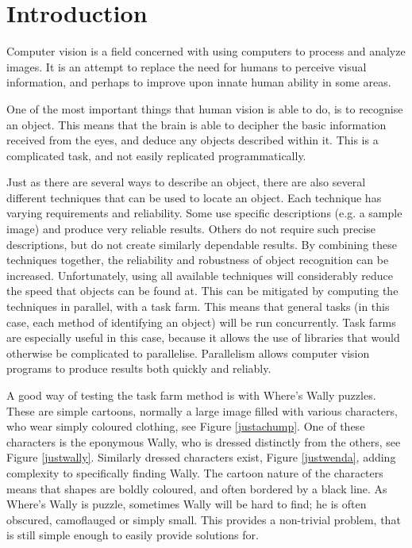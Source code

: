\documentclass[../main.tex]{subfiles}
\begin{document}
  \section{Introduction}
    Computer vision is a field concerned with using computers to process and analyze images. 
    It is an attempt to replace the need for humans to perceive visual information, and perhaps to improve upon innate human ability in some areas.

    One of the most important things that human vision is able to do, is to recognise an object. 
    This means that the brain is able to decipher the basic information received from the eyes, and deduce any objects described within it.
    This is a complicated task, and not easily replicated programmatically.

    Just as there are several ways to describe an object, there are also several different techniques that can be used to locate an object.
    Each technique has varying requirements and reliability.
    Some use specific descriptions (e.g. a sample image) and produce very reliable results.
    Others do not require such precise descriptions, but do not create similarly dependable results.
    By combining these techniques together, the reliability and robustness of object recognition can be increased.
    Unfortunately, using all available techniques will considerably reduce the speed that objects can be found at.
    This can be mitigated by computing the techniques in parallel, with a task farm.
    This means that general tasks (in this case, each method of identifying an object) will be run concurrently.
    Task farms are especially useful in this case, because it allows the use of libraries that would otherwise be complicated to parallelise.
    Parallelism allows computer vision programs to produce results both quickly and reliably.

    A good way of testing the task farm method is with Where's Wally puzzles.
    These are simple cartoons, normally a large image filled with various characters, who wear simply coloured clothing, see Figure \ref{justachump}.
    One of these characters is the eponymous Wally, who is dressed distinctly from the others, see Figure \ref{justwally}.
    Similarly dressed characters exist, Figure \ref{justwenda}, adding complexity to specifically finding Wally.
    The cartoon nature of the characters means that shapes are boldly coloured, and often bordered by a black line.
    As Where's Wally is puzzle, sometimes Wally will be hard to find; he is often obscured, camoflauged or simply small.
    This provides a non-trivial problem, that is still simple enough to easily provide solutions for.
\end{document}
